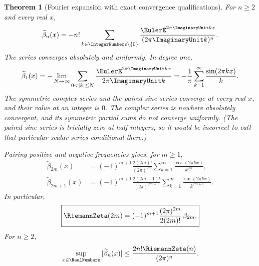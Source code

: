 \documentclass[11pt,a4paper,oneside,openany]{book}
\newtheorem{theorem}{Theorem}[chapter]
\theoremstyle{definition}
\theoremstyle{remark}
\begin{document}
\begin{theorem}[Fourier expansion with exact convergence qualifications]
\label{thm:merged-periodic-bernoulli-fourier}
For $n\geq2$ and every real $x$,
\begin{equation}
 \widetilde\beta_n(x)
 =-n!\sum_{k\in\IntegerNumbers\setminus\{0\}}
 \frac{\EulerE^{2\pi \ImaginaryUnit kx}}{(2\pi \ImaginaryUnit k)^n}.                          \label{eq:merged-periodic-bernoulli-fourier-complex}
\end{equation}
The series converges absolutely and uniformly.  In degree one,
\begin{equation}
 \widetilde\beta_1(x)
 =-\lim_{N\to\infty}\sum_{0<|k|\leq N}
 \frac{\EulerE^{2\pi \ImaginaryUnit kx}}{2\pi \ImaginaryUnit k}
 =-\frac1\pi\sum_{k=1}^{\infty}\frac{\sin(2\pi kx)}{k}.         \label{eq:merged-periodic-bernoulli-fourier-one}
\end{equation}
The symmetric complex series and the paired sine series converge at every
real $x$, and their value at an integer is $0$.  The complex series is nowhere
absolutely convergent, and its symmetric partial sums do not converge
uniformly.  (The paired sine series is trivially zero at half-integers, so it
would be incorrect to call that particular scalar series conditional there.)

Pairing positive and negative frequencies gives, for $m\geq1$,
\begin{align}
 \widetilde\beta_{2m}(x)
 &=(-1)^{m+1}\frac{2(2m)!}{(2\pi)^{2m}}
 \sum_{k=1}^{\infty}\frac{\cos(2\pi kx)}{k^{2m}},                 \label{eq:merged-periodic-bernoulli-fourier-even}\\
 \widetilde\beta_{2m+1}(x)
 &=(-1)^{m+1}\frac{2(2m+1)!}{(2\pi)^{2m+1}}
 \sum_{k=1}^{\infty}\frac{\sin(2\pi kx)}{k^{2m+1}}.             \label{eq:merged-periodic-bernoulli-fourier-odd}
\end{align}
In particular,
\begin{equation}
 \boxed{\displaystyle
 \RiemannZeta(2m)=(-1)^{m+1}
 \frac{(2\pi)^{2m}}{2(2m)!}\,\beta_{2m}.}                        \label{eq:merged-even-zeta-bernoulli}
\end{equation}
For $n\geq2$,
\begin{equation}
 \sup_{x\in\RealNumbers}|\widetilde\beta_n(x)|
 \leq\frac{2n!\RiemannZeta(n)}{(2\pi)^n}.                        \label{eq:merged-periodic-bernoulli-sup}
\end{equation}
\end{theorem}
\end{document}
